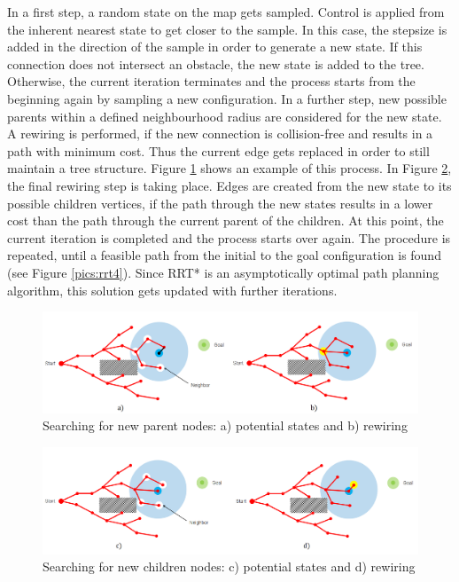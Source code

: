 In a first step, a random state on the map gets sampled. Control is applied from the inherent nearest state to get closer to the sample. In this case, the stepsize is added in the direction of the sample in order to generate a new state. If this connection does not intersect an obstacle, the new state is added to the tree. Otherwise, the current iteration terminates and the process starts from the beginning again by sampling a new configuration. In a further step, new possible parents within a defined neighbourhood radius are considered for the new state. A rewiring is performed, if the new connection is collision-free and results in a path with minimum cost. Thus the current edge gets replaced in order to still maintain a tree structure. Figure \ref{pics:rrt2} shows an example of this process. In Figure \ref{pics:rrt3}, the final rewiring step is taking place. Edges are created from the new state to its possible children vertices, if the path through the new states results in a lower cost than the path through the current parent of the children. At this point, the current iteration is completed and the process starts over again. The procedure is repeated, until a feasible path from the initial to the goal configuration is found (see Figure \ref{pics:rrt4}). Since RRT* is an asymptotically optimal path planning algorithm, this solution gets updated with further iterations.      

\begin{figure} [h]
	\centering
	\includegraphics[width=1\textwidth]{images/rrt2.png}
	\caption{Searching for new parent nodes: a) potential states and b) rewiring  }
	\label{pics:rrt2}
\end{figure}

\begin{figure} [h]
	\centering
	\includegraphics[width=1\textwidth]{images/rrt3.png}
	\caption{Searching for new children nodes: c) potential states and d) rewiring  }
	\label{pics:rrt3}
\end{figure}

